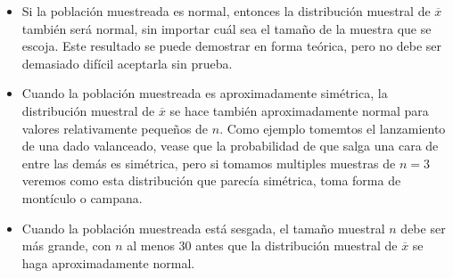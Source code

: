 \documentclass[]{article}
\begin{document}
\begin{itemize}
	\item Si la población muestreada es normal, entonces la distribución muestral de $\overline{x}$ también será normal, sin importar cuál sea el tamaño de la muestra que se escoja. Este resultado se puede demostrar en forma teórica, pero no debe ser demasiado difícil aceptarla sin prueba.
	\item Cuando la población muestreada es aproximadamente simétrica, la distribución muestral de $\overline{x}$ se hace también aproximadamente normal para valores relativamente pequeños de $n$. Como ejemplo tomemtos el lanzamiento de una dado valanceado, vease que la probabilidad de que salga una cara de entre las demás es simétrica, pero si tomamos multiples muestras de $n = 3$ veremos como esta distribución que parecía simétrica, toma forma de montículo o campana.
	\item Cuando la población muestreada está sesgada, el tamaño muestral $n$ debe ser más grande, con $n$ al menos 30 antes que la distribución muestral de $\overline{x}$  se haga aproximadamente normal.
\end{itemize}
\end{document}
